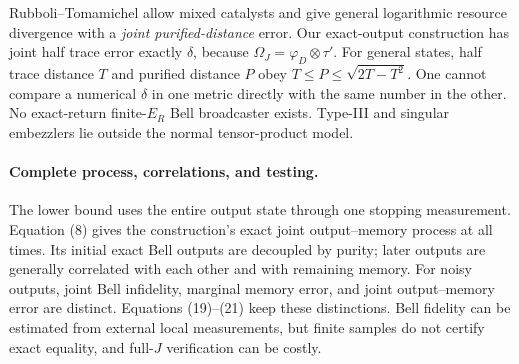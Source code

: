 \documentclass[11pt,a4paper]{article}
\newcommand{\ER}{E_R}
\newcommand{\ph}{\varphi}
\begin{document}
Rubboli--Tomamichel allow mixed catalysts and give general logarithmic resource
divergence with a \emph{joint purified-distance} error. Our exact-output
construction has joint half trace error exactly \(\delta\), because
\(\Omega_J=\ph_D\otimes\tau'\).
For general states, half trace distance \(T\) and purified distance \(P\)
obey \(T\le P\le\sqrt{2T-T^2}\).
One cannot compare a numerical \(\delta\) in one metric directly with the same
number in the other. No exact-return finite-\(\ER\) Bell broadcaster exists.
Type-III and singular embezzlers lie outside the normal tensor-product model.

\paragraph{Complete process, correlations, and testing.}
The lower bound uses the entire output state through one stopping measurement.
Equation (8) gives the construction's exact joint output--memory process at
all times. Its initial exact Bell outputs are decoupled by purity; later
outputs are generally correlated with each other and with remaining memory.
For noisy outputs, joint Bell infidelity, marginal memory error, and joint
output--memory error are distinct. Equations (19)--(21) keep these distinctions.
Bell fidelity can be estimated from external local measurements, but finite
samples do not certify exact equality, and full-\(J\) verification can be costly.
\end{document}
